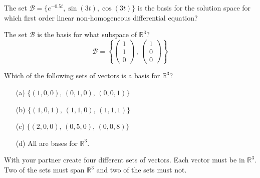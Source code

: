 \begin{problem}
    The set $\mathcal{B} = \{ e^{-0.5t},\sin(3t),\cos(3t)\}$ is the basis for the solution
    space for which first order linear non-homogeneous differential equation?
\end{problem}


\begin{problem}
    The set $\mathcal{B}$ is the basis for what subspace of $\mathbb{R}^3$?
    \[ \mathcal{B} = \left\{ \begin{pmatrix} 1 \\ 1 \\ 0\end{pmatrix} \, , \,
    \begin{pmatrix} 1 \\ 0 \\ 0 \end{pmatrix} \right\} \]
\end{problem}


\begin{problem}
    Which of the following sets of vectors is a basis for $\mathbb{R}^3$?
    \begin{enumerate}
        \item[(a)] $\{(1,0,0), \, (0,1,0), \, (0,0,1) \}$
        \item[(b)] $\{(1,0,1), \, (1,1,0), \, (1,1,1) \}$
        \item[(c)] $\{(2,0,0), \, (0,5,0), \, (0,0,8) \}$
        \item[(d)] All are bases for $\mathbb{R}^3$.
    \end{enumerate}
\end{problem}

%         

\begin{problem}
    With your partner create four different sets of vectors.  Each vector must be in $\mathbb{R}^3$.
    Two of the sets must span $\mathbb{R}^3$ and two of the sets must not.
\end{problem}


%             



